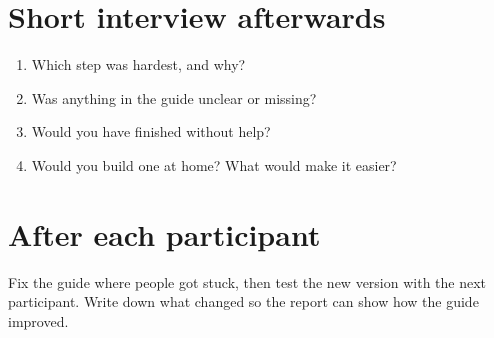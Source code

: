 \begin{planned}
\section*{Short interview afterwards}
\begin{enumerate}
  \item Which step was hardest, and why?
  \item Was anything in the guide unclear or missing?
  \item Would you have finished without help?
  \item Would you build one at home? What would make it easier?
\end{enumerate}

\section*{After each participant}
Fix the guide where people got stuck, then test the new version with the next participant.
Write down what changed so the report can show how the guide improved.
\end{planned}
